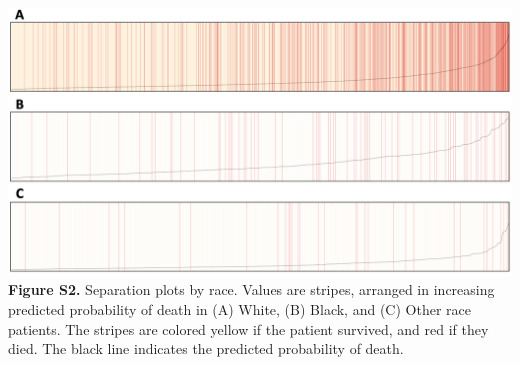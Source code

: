 \documentclass[
]{article}
\begin{document}
\newpage

\includegraphics{images/sep_plot_race.png} \textbf{Figure S2.}
Separation plots by race. Values are stripes, arranged in increasing
predicted probability of death in (A) White, (B) Black, and (C) Other
race patients. The stripes are colored yellow if the patient survived,
and red if they died. The black line indicates the predicted probability
of death.
\end{document}
